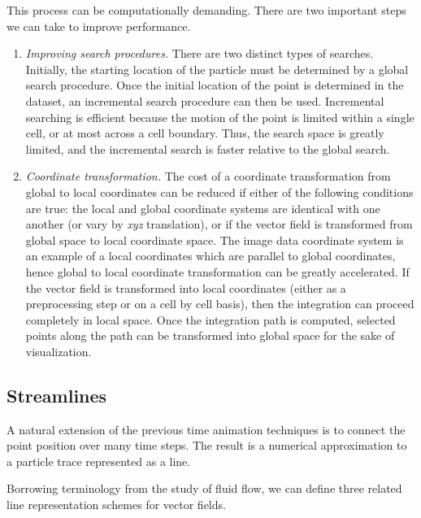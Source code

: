 This process can be computationally demanding. There are two important steps we can take to improve performance.

\begin{enumerate}

\item \emph{Improving search procedures.} There are two distinct types of searches. Initially, the starting location of the particle must be determined by a global search procedure. Once the initial location of the point is determined in the dataset, an incremental search procedure can then be used. Incremental searching is efficient because the motion of the point is limited within a single cell, or at most across a cell boundary. Thus, the search space is greatly limited, and the incremental search is faster relative to the global search.

\item \emph{Coordinate transformation.} The cost of a coordinate transformation from global to local coordinates can be reduced if either of the following conditions are true: the local and global coordinate systems are identical with one another (or vary by \emph{xyz} translation), or if the vector field is transformed from global space to local coordinate space. The image data coordinate system is an example of a local coordinates which are parallel to global coordinates, hence global to local coordinate transformation can be greatly accelerated. If the vector field is transformed into local coordinates (either as a preprocessing step or on a cell by cell basis), then the integration can proceed completely in local space. Once the integration path is computed, selected points along the path can be transformed into global space for the sake of visualization.

\end{enumerate}

\subsection{Streamlines}

A natural extension of the previous time animation techniques is to connect the point position over many time steps. The result is a numerical approximation to a particle trace represented as a line.

Borrowing terminology from the study of fluid flow, we can define three related line representation schemes for vector fields.

